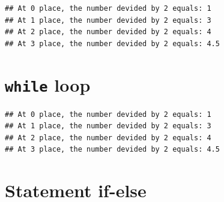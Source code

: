 \documentclass[]{book}
\makeatletter
\newenvironment{Shaded}{\begin{snugshade}}{\end{snugshade}}
\newcommand{\CharTok}[1]{\textcolor[rgb]{0.31,0.60,0.02}{#1}}
\newcommand{\DataTypeTok}[1]{\textcolor[rgb]{0.13,0.29,0.53}{#1}}
\newcommand{\DecValTok}[1]{\textcolor[rgb]{0.00,0.00,0.81}{#1}}
\newcommand{\FunctionTok}[1]{\textcolor[rgb]{0.00,0.00,0.00}{#1}}
\newcommand{\KeywordTok}[1]{\textcolor[rgb]{0.13,0.29,0.53}{\textbf{#1}}}
\newcommand{\NormalTok}[1]{#1}
\newcommand{\StringTok}[1]{\textcolor[rgb]{0.31,0.60,0.02}{#1}}
\newenvironment{kframe}{%
\medskip{}
\setlength{\fboxsep}{.8em}
 \def\at@end@of@kframe{}%
 \ifinner\ifhmode%
  \def\at@end@of@kframe{\end{minipage}}%
  \begin{minipage}{\columnwidth}%
 \fi\fi%
 \def\FrameCommand##1{\hskip\@totalleftmargin \hskip-\fboxsep
 \colorbox{shadecolor}{##1}\hskip-\fboxsep
     \hskip-\linewidth \hskip-\@totalleftmargin \hskip\columnwidth}%
 \MakeFramed {\advance\hsize-\width
   \@totalleftmargin\z@ \linewidth\hsize
   \@setminipage}}%
 {\par\unskip\endMakeFramed%
 \at@end@of@kframe}
\renewenvironment{Shaded}{\begin{kframe}}{\end{kframe}}
\makeatother
\begin{document}
\begin{verbatim}
## At 0 place, the number devided by 2 equals: 1
## At 1 place, the number devided by 2 equals: 3
## At 2 place, the number devided by 2 equals: 4
## At 3 place, the number devided by 2 equals: 4.5
\end{verbatim}

\hypertarget{while-loop}{%
\section{\texorpdfstring{\texttt{while} loop}{while loop}}\label{while-loop}}

\begin{Shaded}
\end{Shaded}

\begin{verbatim}
## At 0 place, the number devided by 2 equals: 1
## At 1 place, the number devided by 2 equals: 3
## At 2 place, the number devided by 2 equals: 4
## At 3 place, the number devided by 2 equals: 4.5
\end{verbatim}

\hypertarget{statement-if-else}{%
\section{Statement if-else}\label{statement-if-else}}
\end{document}
